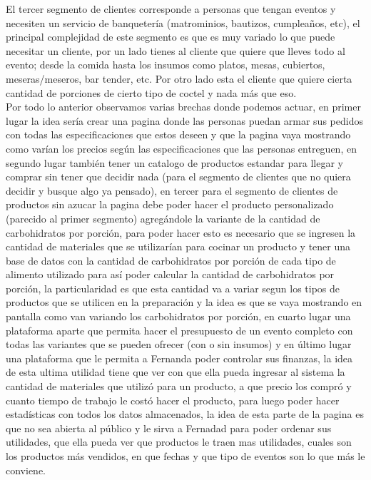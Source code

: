 \documentclass[preprintnumbers,superscriptaddress,amsmath,%
  amssymb,aps,reprint,nofootinbib]{revtex4-1}
\numberwithin{equation}{section}
\begin{document}
El tercer segmento de clientes corresponde a personas que tengan eventos y necesiten un servicio de banquetería (matrominios, bautizos, cumpleaños, etc), el principal complejidad de este segmento es que es muy variado lo que puede necesitar un cliente, por un lado tienes al cliente que quiere que lleves todo al evento; desde la comida hasta los insumos como platos, mesas, cubiertos, meseras/meseros, bar tender, etc. Por otro lado esta el cliente que quiere cierta cantidad de porciones de cierto tipo de coctel y nada más que eso.\\

Por todo lo anterior observamos varias brechas donde podemos actuar, en primer lugar la idea sería crear una pagina donde las personas puedan armar sus pedidos con todas las especificaciones que estos deseen y que la pagina vaya mostrando como varían los precios según las especificaciones que las personas entreguen, en segundo lugar también tener un catalogo de productos estandar para llegar y comprar sin tener que decidir nada (para el segmento de clientes que no quiera decidir y busque algo ya pensado), en tercer para el segmento de clientes de productos sin azucar la pagina debe poder hacer el producto personalizado (parecido al primer segmento) agregándole la variante de la cantidad de carbohidratos por porción, para poder hacer esto es necesario que se ingresen la cantidad de materiales que se utilizarían para cocinar un producto y tener una base de datos con la cantidad de carbohidratos por porción de cada tipo de alimento utilizado para así poder calcular la cantidad de carbohidratos por porción, la particularidad es que esta cantidad va a variar segun los tipos de productos que se utilicen en la preparación y la idea es que se vaya mostrando en pantalla como van variando los carbohidratos por porción, en cuarto lugar una plataforma aparte que permita hacer el presupuesto de un evento completo con todas las variantes que se pueden ofrecer (con o sin insumos) y en último lugar una plataforma que le permita a Fernanda poder controlar sus finanzas, la idea de esta ultima utilidad tiene que ver con que ella pueda ingresar al sistema la cantidad de materiales que utilizó para un producto, a que precio los compró y cuanto tiempo de trabajo le costó hacer el producto, para luego poder hacer estadísticas con todos los datos almacenados, la idea de esta parte de la pagina es que no sea abierta al público y le sirva a Fernadad para poder ordenar sus utilidades, que ella pueda ver que productos le traen mas utilidades, cuales son los productos más vendidos, en que fechas y que tipo de eventos son lo que más le conviene.\\
\end{document}
